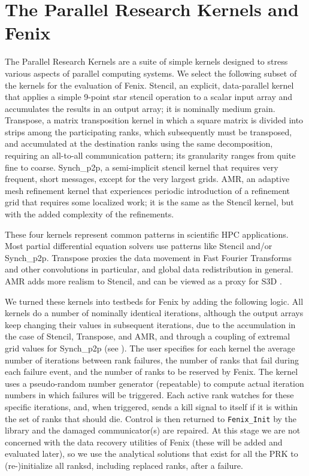 \section{The Parallel Research Kernels and Fenix}\label{sec:PRK}
The Parallel Research Kernels \cite{van2016comparing,PRKrepo}
are a suite of simple kernels designed to stress various aspects of parallel computing systems.
We select the following subset of the kernels for the evaluation of Fenix.
Stencil, an explicit, data-parallel kernel that applies a simple 9-point star stencil
operation to a scalar input array and accumulates the results in an output array; it is nominally medium grain.
Transpose, a matrix transposition kernel in which a square matrix is divided into strips among the
participating ranks, which subsequently must be transposed, and accumulated at the destination ranks using
the same decomposition, requiring an all-to-all communication pattern;
its granularity ranges from quite fine to coarse.
Synch\_p2p, a semi-implicit stencil kernel that requires very frequent, short messages, except for
the very largest grids.
AMR, an adaptive mesh refinement kernel \cite{AMRPRK} that experiences periodic introduction of
a refinement grid that requires some localized work; it is the same as the Stencil kernel,
but with the added complexity of the refinements.

These four kernels represent common patterns in scientific HPC applications. Most partial differential
equation solvers use patterns like Stencil and/or Synch\_p2p. Transpose proxies the data movement
in Fast Fourier Transforms and other convolutions in particular, and global data redistribution in general.
AMR adds more realism to Stencil, and can be viewed as a proxy for S3D
\cite{Gamell:2014}.

We turned these kernels into testbeds for Fenix by adding the following logic.
All kernels do a number of nominally identical iterations, although the output arrays keep
changing their values in subsequent iterations, due to the accumulation in the case of Stencil,
Transpose, and AMR, and through a coupling of extremal grid values for Synch\_p2p
(see \cite{van2016comparing}).
The user specifies for each kernel the average number of iterations between rank failures,
the number of ranks that fail during each failure event, and the number of ranks to be
reserved by Fenix.
The kernel uses a pseudo-random number generator (repeatable) to compute actual iteration
numbers in which failures will be triggered.
Each active rank watches for these specific iterations, and, when triggered, sends a
kill signal to itself if it is within the set of ranks that should die.
Control is then returned to \texttt{Fenix\_Init} by the library and the damaged communicator(s)
are repaired.
At this stage we are not concerned with the data recovery utilities of Fenix (these will be
added and evaluated later), so we use the analytical solutions that exist for all the PRK to (re-)initialize
all ranksd, including replaced ranks, after a failure.


